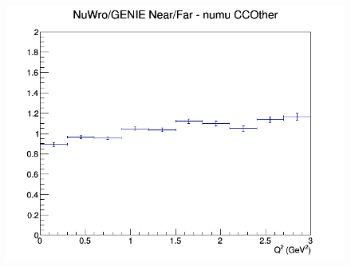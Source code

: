 \documentclass[12pt]{article}
\begin{document}
\begin{figure}[h]
\endminipage
{}
\includegraphics[width=\linewidth]{Q2/nominal/ratios/CCOther_NuWro_GENIE_numu_NF_Q2.png}
\endminipage
\newline
\end{figure}
\clearpage
\end{document}
